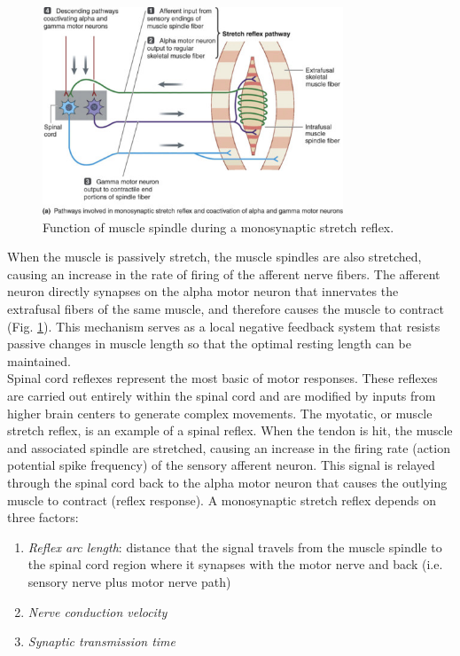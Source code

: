 \documentclass{article}
\begin{document}
\begin{figure}[h]
\centering
\includegraphics[width=0.8\textwidth]{../images/EMG_II_1.jpg}	
\caption{Function of muscle spindle during a monosynaptic stretch reflex.}
\label{spindle}
\end{figure}

When the muscle is passively stretch, the muscle spindles are also stretched, causing an increase in the rate of firing of the afferent nerve fibers. The afferent neuron directly synapses on the alpha motor neuron that innervates the extrafusal fibers of the same muscle, and therefore causes the muscle to contract (Fig. \ref{spindle}). This mechanism serves as a local negative feedback system that resists passive changes in muscle length so that the optimal resting length can be maintained.\\

Spinal cord reflexes represent the most basic of motor responses. These reflexes are carried out entirely within the spinal cord and are modified by inputs from higher brain centers to generate complex movements. The myotatic, or muscle stretch reflex, is an example of a spinal reflex. When the tendon is hit, the muscle and associated spindle are stretched, causing an increase in the firing rate (action potential spike frequency) of the sensory afferent neuron. This signal is relayed through the spinal cord back to the alpha motor neuron that causes the outlying muscle to contract (reflex response). A monosynaptic stretch reflex depends on three factors:

\begin{enumerate}
	\item \textit{Reflex arc length}: distance that the signal travels from the muscle spindle to the spinal cord region where it synapses with the motor nerve and back (i.e. sensory nerve plus motor nerve path)
	\item \textit{Nerve conduction velocity}
	\item \textit{Synaptic transmission time}
\end{enumerate}
\end{document}
